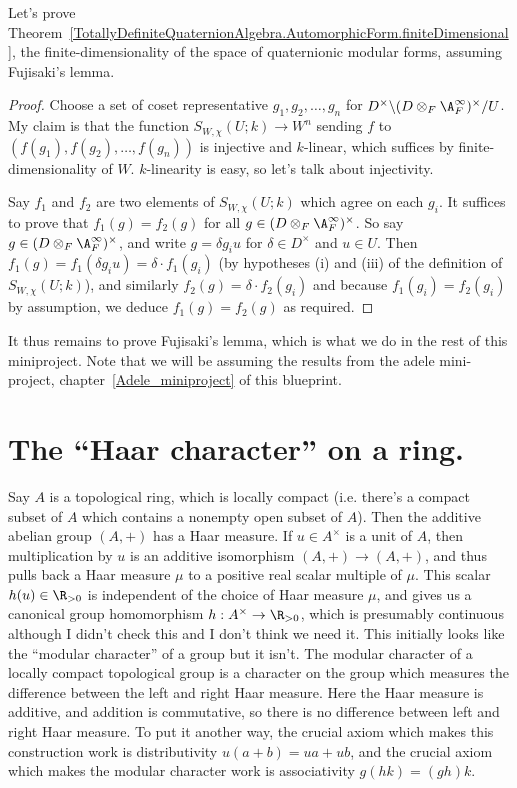 Let's prove Theorem~\ref{TotallyDefiniteQuaternionAlgebra.AutomorphicForm.finiteDimensional},
the finite-dimensionality of the space of quaternionic modular forms,
assuming Fujisaki's lemma.
\begin{proof}
  Choose a set of coset representative $g_1,g_2,\ldots,g_n$ for
  $D^\times\backslash(D\otimes_F\A_F^\infty)^\times/U$. My claim is that
  the function $S_{W,\chi}(U;k)\to W^n$ sending $f$ to $(f(g_1),f(g_2),\ldots,f(g_n))$
  is injective and $k$-linear, which suffices by finite-dimensionality of $W$.
  $k$-linearity is easy, so let's talk about injectivity.

  Say $f_1$ and $f_2$ are two elements of $S_{W,\chi}(U;k)$ which agree on
  each $g_i$. It suffices to prove that $f_1(g)=f_2(g)$ for all
  $g\in(D\otimes_F\A_F^\infty)^\times$. So say $g\in(D\otimes_F\A_F^\infty)^\times$,
  and write $g=\delta g_iu$ for $\delta \in D^\times$ and $u\in U$.
  Then $f_1(g)=f_1(\delta g_iu)=\delta\cdot f_1(g_i)$ (by hypotheses (i) and (iii)
  of the definition of $S_{W,\chi}(U;k)$), and similarly $f_2(g)=\delta\cdot f_2(g_i)$
  and because $f_1(g_i)=f_2(g_i)$ by assumption, we deduce $f_1(g)=f_2(g)$ as required.
\end{proof}

It thus remains to prove Fujisaki's lemma, which is what we do in the rest of this
miniproject. Note that we will be assuming the results
from the adele mini-project, chapter~\ref{Adele_miniproject} of this blueprint.

\section{The ``Haar character'' on a ring.}

Say $A$ is a topological ring, which is locally compact (i.e. there's a compact
subset of $A$ which contains a nonempty open subset of $A$). Then the additive
abelian group $(A,+)$ has a Haar measure. If $u\in A^\times$ is a unit of $A$,
then multiplication by $u$ is an additive isomorphism $(A,+)\to(A,+)$, and thus
pulls back a Haar measure $\mu$ to a positive real scalar multiple of $\mu$. This
scalar $h(u)\in\R_{>0}$ is independent of the choice of Haar measure $\mu$,
and gives us a canonical group homomorphism $h:A^\times\to\R_{>0}$, which is
presumably continuous although I didn't check this and I don't think we need it.
This initially looks like the ``modular character'' of a group but it isn't.
The modular character of a locally compact topological group is a character on
the group which measures the difference between the left and right Haar measure.
Here the Haar measure is additive, and addition is commutative, so there is
no difference between left and right Haar measure. To put it another way,
the crucial axiom which makes this construction work is distributivity $u(a+b)=ua+ub$,
and the crucial axiom which makes the modular character work is associativity $g(hk)=(gh)k$.

